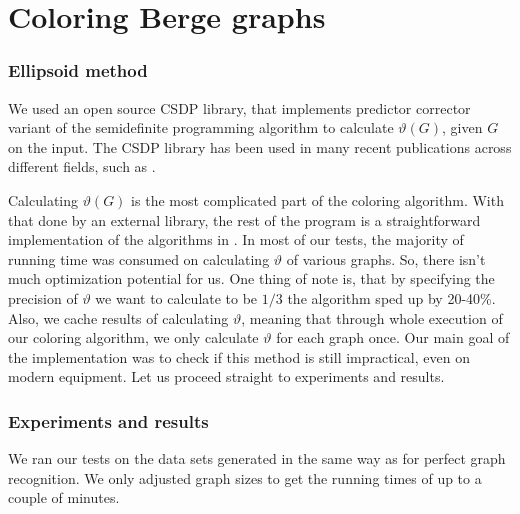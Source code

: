 \section{Coloring Berge graphs}

\subsubsection{Ellipsoid method}

We used an open source CSDP \cite{csdpRepo, csdp1999} library, that implements predictor corrector variant of the semidefinite programming algorithm to calculate $\vartheta(G)$, given $G$ on the input. The CSDP library has been used in many recent publications across different fields, such as \cite{Ampountolas_2017, Adasme_2011}.

Calculating $\vartheta(G)$ is the most complicated part of the coloring algorithm. With that done by an external library, the rest of the program is a straightforward implementation of the algorithms in . In most of our tests, the majority of running time was consumed on calculating $\vartheta$ of various graphs. So, there isn't much optimization potential for us. One thing of note is, that by specifying the precision of $\vartheta$ we want to calculate to be $1/3$ the algorithm sped up  by 20-40\%. Also, we cache results of calculating $\vartheta$, meaning that through whole execution of our coloring algorithm, we only calculate $\vartheta$ for each graph once. Our main goal of the implementation was to check if this method is still impractical, even on modern equipment. Let us proceed straight to experiments and results.

\subsubsection{Experiments and results}

We ran our tests on the data sets generated in the same way as for perfect graph recognition. We only adjusted graph sizes to get the running times of up to a couple of minutes. 

